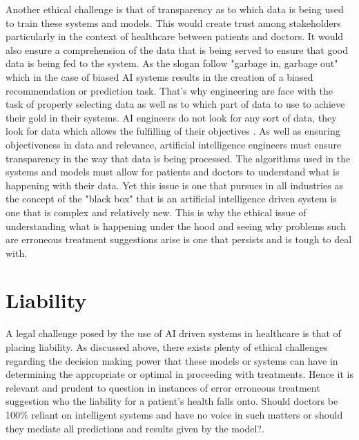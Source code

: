 \documentclass[a4paper,12pt,oneside]{report}
\begin{document}
Another ethical challenge is that of transparency as to which data is being used to train these systems and models. This would create trust among stakeholders particularly in the context of healthcare between patients and doctors. It would also ensure a comprehension of the data that is being served to ensure that good data is being fed to the system. As the slogan follow "garbage in, garbage out" which in the case of biased AI systems results in the creation of a biased recommendation or prediction task. That's why engineering are face with the task of properly selecting data as well as to  which part of data to use to achieve their gold in their systems. AI engineers do not look for any sort of data, they look for data which allows the fulfilling of their objectives \cite{4}.  As well as ensuring objectiveness in data and relevance, artificial intelligence engineers must ensure transparency in the way that data is being processed. The algorithms used in the systems and models must allow for patients and doctors to understand what is happening with their data. Yet this issue is one that pursues in all industries as the concept of the "black box" that is an artificial intelligence driven system is one that is complex and relatively new. This is why the ethical issue of understanding what is happening under the hood and seeing why problems such are erroneous treatment suggestions arise is one that persists and is tough to deal with.

\section{Liability}

A legal challenge posed by the use of AI driven systems in healthcare is that of placing liability. As discussed above, there exists plenty of ethical challenges regarding the decision making power that these models or systems can have in determining the appropriate or optimal in proceeding with treatments. Hence it is relevant and prudent to question in instances of error erroneous treatment suggestion who the liability for a patient's health falls onto. Should doctors be 100\% reliant on intelligent systems and have no voice in such matters or should they mediate all predictions and results given by the model?. 
\end{document}
